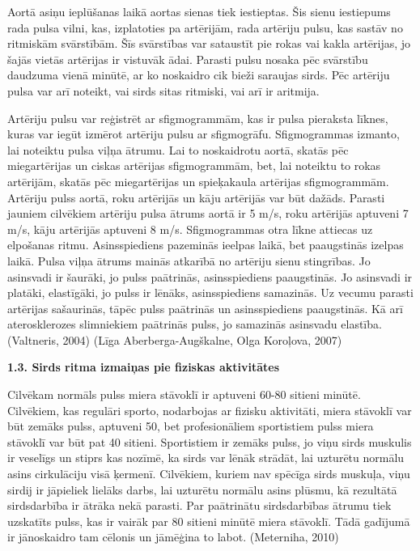\documentclass[12pt]{article}
\begin{document}
Aortā asiņu ieplūšanas laikā aortas sienas tiek iestieptas. Šis sienu iestiepums rada pulsa vilni, kas, izplatoties pa artērijām, rada artēriju pulsu, kas sastāv no ritmiskām svārstībām. Šīs svārstības var sataustīt pie rokas vai kakla artērijas, jo šajās vietās artērijas ir vistuvāk ādai. Parasti pulsu nosaka pēc svārstību daudzuma vienā minūtē, ar ko noskaidro cik bieži saraujas sirds. Pēc artēriju pulsa var arī noteikt, vai sirds sitas ritmiski, vai arī ir aritmija. \par
Artēriju pulsu var reģistrēt ar sfigmogrammām, kas ir pulsa pieraksta līknes, kuras  var iegūt izmērot artēriju pulsu ar sfigmogrāfu. Sfigmogrammas izmanto, lai noteiktu pulsa viļņa ātrumu. Lai to noskaidrotu aortā, skatās pēc miegartērijas un ciskas artērijas sfigmogrammām, bet, lai noteiktu to rokas artērijām, skatās pēc miegartērijas un spieķakaula artērijas sfigmogrammām. Artēriju pulss aortā, roku artērijās un kāju artērijās var būt dažāds. Parasti jauniem cilvēkiem artēriju pulsa ātrums aortā ir 5 m/s, roku artērijās aptuveni 7 m/s, kāju artērijās aptuveni 8 m/s. Sfigmogrammas otra līkne attiecas uz elpošanas ritmu. Asinsspiediens pazeminās ieelpas laikā, bet paaugstinās izelpas laikā. Pulsa viļņa ātrums mainās atkarībā no artēriju sienu stingrības. Jo asinsvadi ir šaurāki, jo pulss paātrinās, asinsspiediens paaugstinās. Jo asinsvadi ir platāki, elastīgāki, jo pulss ir lēnāks, asinsspiediens samazinās. Uz vecumu parasti artērijas sašaurinās, tāpēc pulss paātrinās un asinsspiediens paaugstinās. Kā arī aterosklerozes slimniekiem paātrinās pulss, jo samazinās asinsvadu elastība. 
(Valtneris, 2004) (Līga Aberberga-Augškalne, Olga Koroļova, 2007)



\begin{center}
{\bf 1.3. Sirds ritma izmaiņas pie fiziskas aktivitātes}
\end{center}

Cilvēkam normāls pulss miera stāvoklī ir aptuveni 60-80 sitieni minūtē. Cilvēkiem, kas regulāri sporto, nodarbojas ar fizisku aktivitāti, miera stāvoklī var būt zemāks pulss, aptuveni 50, bet profesionāliem sportistiem pulss miera stāvoklī var būt pat 40 sitieni. Sportistiem ir zemāks pulss, jo viņu sirds muskulis ir veselīgs un stiprs kas nozīmē, ka sirds var lēnāk strādāt, lai uzturētu normālu asins cirkulāciju visā ķermenī. Cilvēkiem, kuriem nav spēcīga sirds muskuļa, viņu sirdij ir jāpieliek lielāks darbs, lai uzturētu normālu asins plūsmu, kā rezultātā sirdsdarbība ir ātrāka nekā parasti. Par paātrinātu sirdsdarbības ātrumu tiek uzskatīts pulss, kas ir vairāk par 80 sitieni minūtē miera stāvoklī. Tādā gadījumā ir jānoskaidro tam cēlonis un jāmēģina to labot. (Meterniha, 2010)
\end{document}
